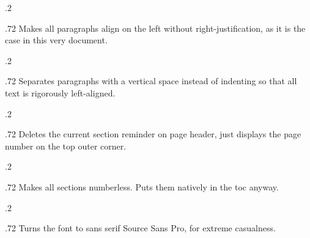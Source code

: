 \documentclass[
	raggedright,
	twoside,
	12pt,
	colorful,
]{tufte-style-article}
\begin{document}
\medskip
\begin{minipagewithmarginpars}[t]{.2\textwidth}
	\raggedleft
\end{minipagewithmarginpars}\hfill%
\begin{minipagewithmarginpars}[t]{.72\textwidth}
	Makes all paragraphs align on the left without right-justification, as it is the case in this very document. \\
\end{minipagewithmarginpars}
\smallskip
\begin{minipagewithmarginpars}[t]{.2\textwidth}
	\raggedleft
\end{minipagewithmarginpars}\hfill%
\begin{minipagewithmarginpars}[t]{.72\textwidth}
	Separates paragraphs with a vertical space instead of indenting so that all text is rigorously left-aligned.
\end{minipagewithmarginpars}
\smallskip
\begin{minipagewithmarginpars}[t]{.2\textwidth}
	\raggedleft
\end{minipagewithmarginpars}\hfill%
\begin{minipagewithmarginpars}[t]{.72\textwidth}
	Deletes the current section reminder on page header, just displays the page number on the top outer corner.
\end{minipagewithmarginpars}
\smallskip
\begin{minipagewithmarginpars}[t]{.2\textwidth}
	\raggedleft
\end{minipagewithmarginpars}\hfill%
\begin{minipagewithmarginpars}[t]{.72\textwidth}
	Makes all sections numberless. Puts them natively in the toc anyway.
\end{minipagewithmarginpars}
\smallskip
\begin{minipagewithmarginpars}[t]{.2\textwidth}
	\raggedleft
\end{minipagewithmarginpars}\hfill%
\begin{minipagewithmarginpars}[t]{.72\textwidth}
	Turns the font to sans serif Source Sans Pro, for extreme casualness.
\end{minipagewithmarginpars}
\end{document}
